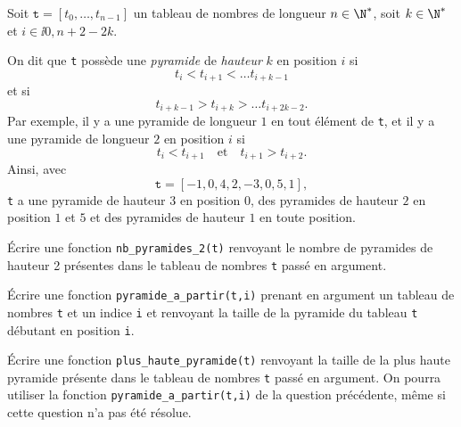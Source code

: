 Soit $\texttt{t} = [t_0,\dots,t_{n-1}]$ un tableau de nombres de longueur $n\in\N^\ast$, soit $k \in \N^\ast$ et $i \in \ii{0,n+2-2k}$.

On dit que \texttt{t} possède une \emph{pyramide} de \emph{hauteur} $k$ en position $i$ si
\begin{equation*}
  t_{i} < t_{i+1} < \dots t_{i+k-1}
\end{equation*}
et si 
\begin{equation*}
  t_{i+k-1} > t_{i+k} > \dots t_{i+2k-2}.
\end{equation*}
Par exemple, il y a une pyramide de longueur $1$ en tout élément de \texttt{t}, et il y a une pyramide de longueur $2$ en position $i$ si 
\begin{equation*}
  t_i < t_{i+1} \quad\textrm{et}\quad t_{i+1}> t_{i+2}.
\end{equation*}
Ainsi, avec 
\begin{equation*}
  \texttt{t} = [-1,0,4,2,-3,0,5,1],
\end{equation*}
\texttt{t} a une pyramide de hauteur 3 en position $0$, des pyramides de hauteur $2$ en position $1$ et $5$ et des pyramides de hauteur $1$ en toute position.
\bigskip{}

\question{} Écrire une fonction \texttt{nb\_pyramides\_2(t)} renvoyant le nombre de pyramides de hauteur 2 présentes dans le tableau de nombres \texttt{t} passé en argument. 

\medskip{}

\question{} Écrire une fonction \texttt{pyramide\_a\_partir(t,i)} prenant en argument un tableau de nombres \texttt{t} et un indice \texttt{i} et renvoyant la taille de la pyramide du tableau \texttt{t} débutant en position \texttt{i}.

\medskip{}

\question{} Écrire une fonction \texttt{plus\_haute\_pyramide(t)} renvoyant la taille de la plus haute pyramide présente dans le tableau de nombres \texttt{t} passé en argument. 
On pourra utiliser la fonction \texttt{pyramide\_a\_partir(t,i)} de la question précédente, même si cette question n'a pas été résolue. 